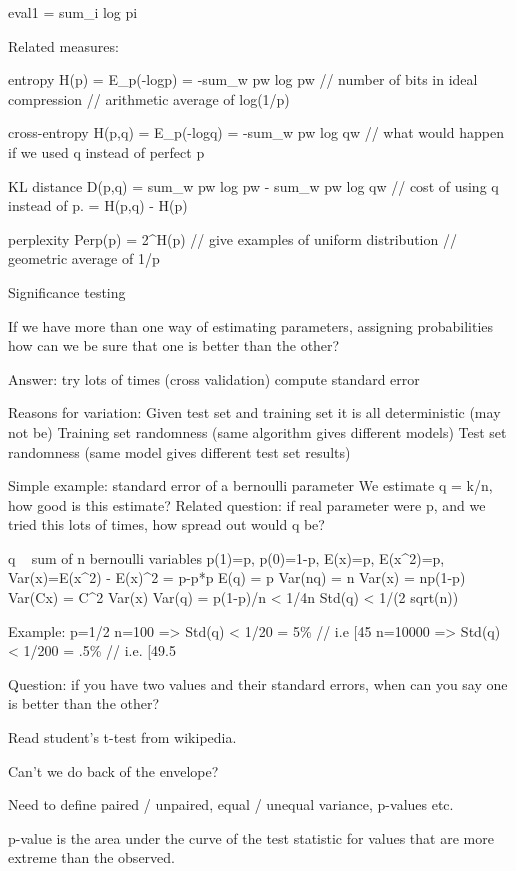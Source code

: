 eval1 = sum_i log pi

Related measures:

entropy H(p) = E_p(-logp) = -sum_w pw log pw 
// number of bits in ideal compression
// arithmetic average of log(1/p)

cross-entropy H(p,q) = E_p(-logq) = -sum_w pw log qw  
// what would happen if we used q instead of perfect p

KL distance D(p,q) = sum_w pw log pw - sum_w pw log qw  
// cost of using q instead of p. = H(p,q) - H(p)

perplexity Perp(p) = 2^H(p)
// give examples of uniform distribution
// geometric average of 1/p



Significance testing

If we have more than one way of estimating parameters, assigning
probabilities how can we be sure that one is better than the other?

Answer: try lots of times (cross validation)
compute standard error

Reasons for variation: 
Given test set and training set it is all deterministic (may not be)
Training set randomness (same algorithm gives different models)
Test set randomness (same model gives different test set results)

Simple example: standard error of a bernoulli parameter
We estimate q = k/n, how good is this estimate?
Related question: if real parameter were p, and we tried this lots of
times, how spread out would q be?

q ~ sum of n bernoulli variables
p(1)=p, p(0)=1-p, E(x)=p, E(x^2)=p, Var(x)=E(x^2) - E(x)^2 = p-p*p 
E(q) = p
Var(nq) = n Var(x) = np(1-p)
Var(Cx) = C^2 Var(x)
Var(q) = p(1-p)/n < 1/4n
Std(q) < 1/(2 sqrt(n))

Example: p=1/2
n=100 => Std(q) < 1/20 = 5\%  // i.e [45%
n=10000 => Std(q) < 1/200 = .5\% // i.e. [49.5%

Question: if you have two values and their standard errors, when can
you say one is better than the other?

Read student's t-test from wikipedia.

Can't we do back of the envelope?

Need to define paired / unpaired, equal / unequal variance, p-values
etc.

p-value is the area under the curve of the test statistic for values
that are more extreme than the observed.


